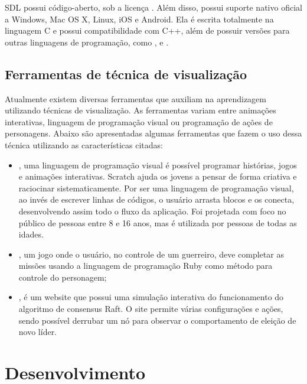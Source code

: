 \documentclass[12pt, %
openright,
oneside, %
a4paper,    %
brazil]{facom-ufu-abntex2}
\begin{document}
SDL possui código-aberto, sob a licença . Além disso, possui suporte nativo oficial a Windows, Mac OS X, Linux, iOS e Android. Ela é escrita totalmente na linguagem C e possui compatibilidade com C++, além de possuir versões para outras linguagens de programação, como ,  e .

\section{Ferramentas de técnica de visualização}
Atualmente existem diversas ferramentas que auxiliam na aprendizagem utilizando técnicas de visualização. As ferramentas variam entre animações interativas, linguagem de programação visual ou programação de ações de personagens. Abaixo são apresentadas algumas ferramentas que fazem o uso dessa técnica utilizando as características citadas:

\begin{itemize}

    \item {}, uma linguagem de programação visual é possível programar histórias, jogos e animações interativas. Scratch ajuda os jovens a pensar de forma criativa e raciocinar sistematicamente. Por ser uma linguagem de programação visual, ao invés de escrever linhas de códigos, o usuário arrasta blocos e os conecta, desenvolvendo assim todo o fluxo da aplicação. Foi projetada com foco no público de pessoas entre 8 e 16 anos, mas é utilizada por pessoas de todas as idades.

    \item {}, um jogo onde o usuário, no controle de um guerreiro, deve completar as missões usando a linguagem de programação Ruby como método para controle do personagem;

    \item {}, é um website que possui uma simulação interativa do funcionamento do algoritmo de consensus Raft. O site permite várias configurações e ações, sendo possível derrubar um nó para observar o comportamento de eleição de novo líder.

\end{itemize}


\chapter{Desenvolvimento}
\end{document}
